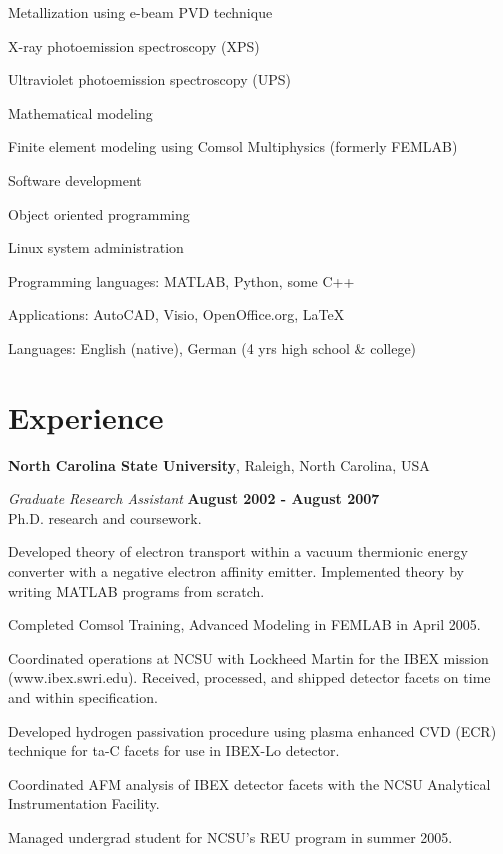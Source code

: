 \documentclass[letterpaper,margin,line]{res}
\newenvironment{list1}{
  \begin{list}{\ding{113}}{%
      \setlength{\itemsep}{0in}
      \setlength{\parsep}{0in} \setlength{\parskip}{0in}
      \setlength{\topsep}{0in} \setlength{\partopsep}{0in} 
      \setlength{\leftmargin}{0.17in}}}{\end{list}}
\begin{document}
\begin{resume}
\vspace*{-2.5mm}
Metallization using e-beam PVD technique

\vspace*{-2.5mm}
X-ray photoemission spectroscopy (XPS)

\vspace*{-2.5mm}
Ultraviolet photoemission spectroscopy (UPS)

\vspace*{-2.5mm}
Mathematical modeling

\vspace*{-2.5mm}
Finite element modeling using Comsol Multiphysics (formerly FEMLAB)

\vspace*{-2.5mm}
Software development

\vspace*{-2.5mm}
Object oriented programming

\vspace*{-2.5mm}
Linux system administration

\vspace*{-2.5mm}
Programming languages: MATLAB, Python, some C++

\vspace*{-2.5mm}
Applications: AutoCAD, Visio, OpenOffice.org, \LaTeX

\vspace*{-2.5mm}
Languages: English (native), German (4 yrs high school \& college)

\section{\sc Experience}
{\bf North Carolina State University}, Raleigh, North Carolina, USA

\vspace{-.3cm}
{\em Graduate Research Assistant} \hfill {\bf August 2002 - August 2007}\\
Ph.D. research and coursework.
\begin{list1}
\item[] Developed theory of electron transport within a vacuum thermionic energy converter with a negative electron affinity emitter. Implemented theory by writing MATLAB programs from scratch.
\item[] Completed Comsol Training, Advanced Modeling in FEMLAB in April 2005.
\item[] Coordinated operations at NCSU with Lockheed Martin for the IBEX mission (www.ibex.swri.edu). Received, processed, and shipped detector facets on time and within specification.
\item[] Developed hydrogen passivation procedure using plasma enhanced CVD (ECR) technique for ta-C facets for use in IBEX-Lo detector.
\item[] Coordinated AFM analysis of IBEX detector facets with the NCSU Analytical Instrumentation Facility.
\item[] Managed undergrad student for NCSU's REU program in summer 2005.
\end{list1}


\end{resume}
\end{document}
